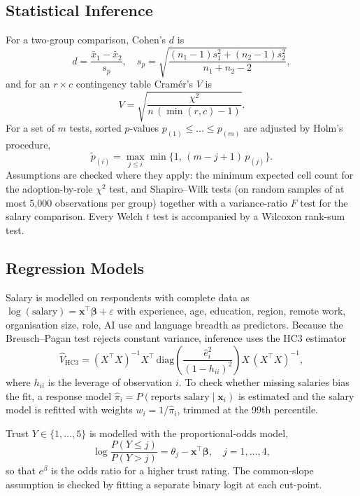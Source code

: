 \documentclass[conference]{IEEEtran}
\begin{document}
\subsection{Statistical Inference}
For a two-group comparison, Cohen's $d$ is
\begin{equation}
d=\frac{\bar{x}_1-\bar{x}_2}{s_p},\quad s_p=\sqrt{\frac{(n_1-1)s_1^2+(n_2-1)s_2^2}{n_1+n_2-2}},
\end{equation}
and for an $r\times c$ contingency table Cram\'er's $V$ is
\begin{equation}
V=\sqrt{\frac{\chi^2}{n\,(\min(r,c)-1)}}.
\end{equation}
For a set of $m$ tests, sorted $p$-values $p_{(1)}\le\dots\le p_{(m)}$ are adjusted by Holm's procedure,
\begin{equation}
\tilde p_{(i)}=\max_{j\le i}\min\{1,\,(m-j+1)\,p_{(j)}\}.
\end{equation}
Assumptions are checked where they apply: the minimum expected cell count for the adoption-by-role $\chi^2$ test, and Shapiro--Wilk tests (on random samples of at most 5{,}000 observations per group) together with a variance-ratio $F$ test for the salary comparison. Every Welch $t$ test is accompanied by a Wilcoxon rank-sum test.

\subsection{Regression Models}
Salary is modelled on respondents with complete data as $\log(\text{salary})=\mathbf{x}^\top\boldsymbol\beta+\varepsilon$ with experience, age, education, region, remote work, organisation size, role, AI use and language breadth as predictors. Because the Breusch--Pagan test rejects constant variance, inference uses the HC3 estimator
\begin{equation}
\widehat{V}_{\text{HC3}}=(X^\top X)^{-1}X^\top\,\mathrm{diag}\!\left(\frac{\hat e_i^2}{(1-h_{ii})^2}\right)X\,(X^\top X)^{-1},
\end{equation}
where $h_{ii}$ is the leverage of observation $i$. To check whether missing salaries bias the fit, a response model $\hat\pi_i=P(\text{reports salary}\mid\mathbf{x}_i)$ is estimated and the salary model is refitted with weights $w_i=1/\hat\pi_i$, trimmed at the 99th percentile.

Trust $Y\in\{1,\dots,5\}$ is modelled with the proportional-odds model,
\begin{equation}
\log\frac{P(Y\le j)}{P(Y>j)}=\theta_j-\mathbf{x}^\top\boldsymbol\beta,\quad j=1,\dots,4,
\end{equation}
so that $e^{\beta}$ is the odds ratio for a higher trust rating. The common-slope assumption is checked by fitting a separate binary logit at each cut-point.
\end{document}
